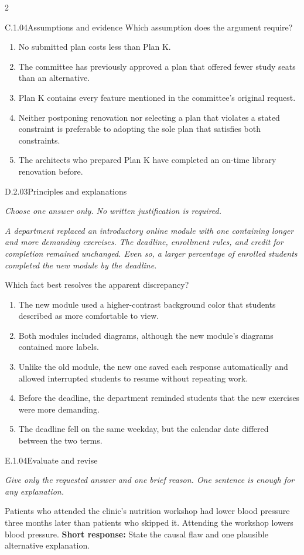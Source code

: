 \documentclass[9pt]{extarticle}
\newcommand{\choice}[1]{\item #1}
\begin{document}
\begin{multicols}{2}
\begin{DenseCoreProblem}{C.1.04}{Assumptions and evidence}
Which assumption does the argument require?
\begin{enumerate}[label=(\alph*)]
  \choice{No submitted plan costs less than Plan K.}
  \choice{The committee has previously approved a plan that offered fewer study seats than an alternative.}
  \choice{Plan K contains every feature mentioned in the committee's original request.}
  \choice{Neither postponing renovation nor selecting a plan that violates a stated constraint is preferable to adopting the sole plan that satisfies both constraints.}
  \choice{The architects who prepared Plan K have completed an on-time library renovation before.}
\end{enumerate}
\end{DenseCoreProblem}
\begin{DenseCoreProblem}{D.2.03}{Principles and explanations}
{\scriptsize\textit{Choose one answer only. No written justification is required.}\par}
\emph{A department replaced an introductory online module with one containing longer and more demanding exercises. The deadline, enrollment rules, and credit for completion remained unchanged. Even so, a larger percentage of enrolled students completed the new module by the deadline.}

Which fact best resolves the apparent discrepancy?
\begin{enumerate}[label=(\alph*)]
  \choice{The new module used a higher-contrast background color that students described as more comfortable to view.}
  \choice{Both modules included diagrams, although the new module's diagrams contained more labels.}
  \choice{Unlike the old module, the new one saved each response automatically and allowed interrupted students to resume without repeating work.}
  \choice{Before the deadline, the department reminded students that the new exercises were more demanding.}
  \choice{The deadline fell on the same weekday, but the calendar date differed between the two terms.}
\end{enumerate}
\end{DenseCoreProblem}
\begin{DenseCoreProblem}{E.1.04}{Evaluate and revise}
{\scriptsize\textit{Give only the requested answer and one brief reason. One sentence is enough for any explanation.}\par}
Patients who attended the clinic's nutrition workshop had lower blood pressure three months later than patients who skipped it. Attending the workshop lowers blood pressure.
\textbf{Short response:} State the causal flaw and one plausible alternative explanation.
\end{DenseCoreProblem}
\end{multicols}
\end{document}
